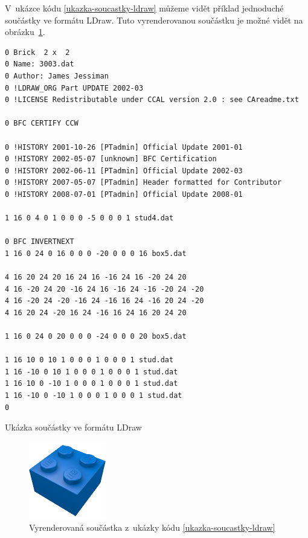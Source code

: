         V~ukázce kódu \ref{ukazka-soucastky-ldraw} můžeme vidět příklad jednoduché součástky ve formátu LDraw. Tuto vyrenderovanou součástku je možné vidět na obrázku~\ref{obrazek-ldraw-soucastka}.
            
       \begin{listing}[htbp]
            \begin{verbatim}
0 Brick  2 x  2
0 Name: 3003.dat
0 Author: James Jessiman
0 !LDRAW_ORG Part UPDATE 2002-03
0 !LICENSE Redistributable under CCAL version 2.0 : see CAreadme.txt

0 BFC CERTIFY CCW

0 !HISTORY 2001-10-26 [PTadmin] Official Update 2001-01
0 !HISTORY 2002-05-07 [unknown] BFC Certification
0 !HISTORY 2002-06-11 [PTadmin] Official Update 2002-03
0 !HISTORY 2007-05-07 [PTadmin] Header formatted for Contributor
0 !HISTORY 2008-07-01 [PTadmin] Official Update 2008-01

1 16 0 4 0 1 0 0 0 -5 0 0 0 1 stud4.dat

0 BFC INVERTNEXT
1 16 0 24 0 16 0 0 0 -20 0 0 0 16 box5.dat

4 16 20 24 20 16 24 16 -16 24 16 -20 24 20
4 16 -20 24 20 -16 24 16 -16 24 -16 -20 24 -20
4 16 -20 24 -20 -16 24 -16 16 24 -16 20 24 -20
4 16 20 24 -20 16 24 -16 16 24 16 20 24 20

1 16 0 24 0 20 0 0 0 -24 0 0 0 20 box5.dat

1 16 10 0 10 1 0 0 0 1 0 0 0 1 stud.dat
1 16 -10 0 10 1 0 0 0 1 0 0 0 1 stud.dat
1 16 10 0 -10 1 0 0 0 1 0 0 0 1 stud.dat
1 16 -10 0 -10 1 0 0 0 1 0 0 0 1 stud.dat
0
            \end{verbatim}
            \caption{Ukázka součástky ve formátu LDraw \autocite{ldraw:model}\label{ukazka-soucastky-ldraw}}
        \end{listing}
  
        \begin{figure}[htbp]
            \centering
            \includegraphics[width=0.3\textwidth,height=\textheight,keepaspectratio]{images/3003.png}
            \caption{Vyrenderovaná součástka z~ukázky kódu \ref{ukazka-soucastky-ldraw} \autocite{rebrickable:part:image:3003}\label{obrazek-ldraw-soucastka}}
        \end{figure}

